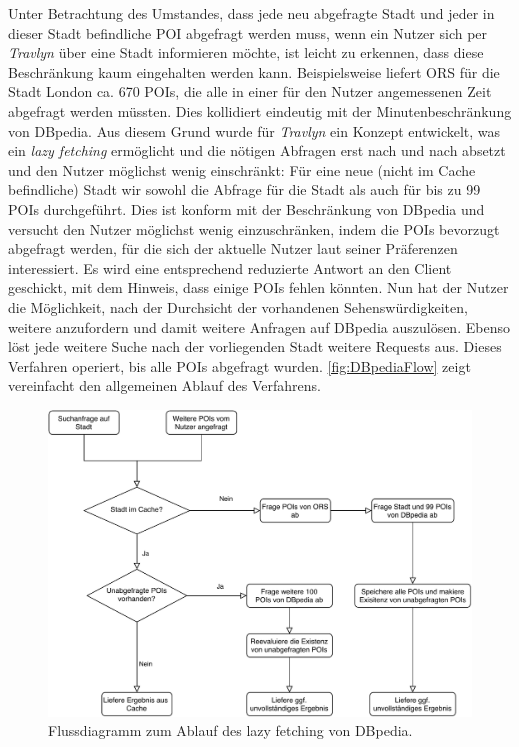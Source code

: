 	Unter Betrachtung des Umstandes, dass jede neu abgefragte Stadt und jeder in dieser Stadt befindliche \acs{POI} abgefragt werden muss, wenn ein Nutzer sich per \textit{Travlyn} über eine Stadt informieren möchte, ist leicht zu erkennen, dass diese Beschränkung kaum eingehalten werden kann. Beispielsweise liefert \acs{ORS} für die Stadt London ca. 670 \acs{POI}s, die alle in einer für den Nutzer angemessenen Zeit abgefragt werden müssten. Dies kollidiert eindeutig mit der Minutenbeschränkung von DBpedia.
	Aus diesem Grund wurde für \textit{Travlyn} ein Konzept entwickelt, was ein \textit{lazy fetching} ermöglicht und die nötigen Abfragen erst nach und nach absetzt und den Nutzer möglichst wenig einschränkt:
	Für eine neue (nicht im Cache befindliche) Stadt wir sowohl die Abfrage für die Stadt als auch für bis zu 99 \acs{POI}s durchgeführt. Dies ist konform mit der Beschränkung von DBpedia und versucht den Nutzer möglichst wenig einzuschränken, indem die \acs{POI}s bevorzugt abgefragt werden, für die sich der aktuelle Nutzer laut seiner Präferenzen interessiert. Es wird eine entsprechend reduzierte Antwort an den Client geschickt, mit dem Hinweis, dass einige \acs{POI}s fehlen könnten. Nun hat der Nutzer die Möglichkeit, nach der Durchsicht der vorhandenen Sehenswürdigkeiten, weitere anzufordern und damit weitere Anfragen auf DBpedia auszulösen. Ebenso löst jede weitere Suche nach der vorliegenden Stadt weitere Requests aus. Dieses Verfahren operiert, bis alle \acs{POI}s abgefragt wurden. \autoref{fig:DBpediaFlow} zeigt vereinfacht den allgemeinen Ablauf des Verfahrens.
	
	\begin{figure}[ht!]
		\centering
		\includegraphics[width=1\textwidth]{images/DBpediaFlow.pdf}
		\caption{Flussdiagramm zum Ablauf des lazy fetching von DBpedia.}
		\label{fig:DBpediaFlow}
	\end{figure}

